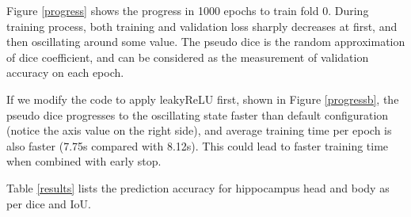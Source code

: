 \documentclass{article}
\begin{document}
Figure \ref{progress} shows the progress in 1000 epochs to train fold 0. During training process, both training and validation loss sharply decreases at first, and then oscillating around some value. The pseudo dice is the random approximation of dice coefficient, and can be considered as the measurement of validation accuracy on each epoch.

If we modify the code to apply leakyReLU first, shown in Figure \ref{progressb}, the pseudo dice progresses to the oscillating state faster than default configuration (notice the axis value on the right side), and average training time per epoch is also faster (7.75s compared with 8.12s). This could lead to faster training time when combined with early stop.

Table \ref{results} lists the prediction accuracy for hippocampus head and body as per dice and IoU.
\end{document}
